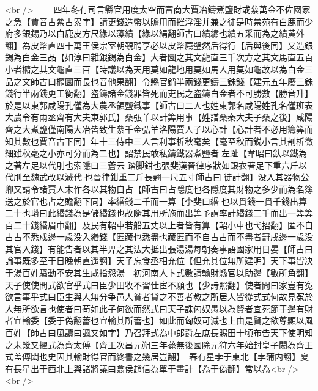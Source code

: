 <br />
　　四年冬有司言縣官用度太空而富商大賈冶鑄煮鹽財或絫萬金不佐國家之急【賈音古絫古累字】請更錢造幣以贍用而摧浮淫并兼之徒是時禁苑有白鹿而少府多銀錫乃以白鹿皮方尺緣以藻繢【緣以絹翻師古曰繢繡也繢五采而為之繢黄外翻】為皮幣直四十萬王侯宗室朝覲聘享必以皮幣薦璧然后得行【后與後同】又造銀錫為白金三品【如淳曰雜銀錫為白金】大者圜之其文龍直三千次方之其文馬直五百小者橢之其文龜直三百【時議以為天用莫如龍地用莫如馬人用莫如龜故以為白金三品之文師古曰橢圜而長也音他果翻】令縣官銷半兩錢更鑄三銖錢【建元五年廢三銖錢行半兩錢更工衡翻】盗鑄諸金錢罪皆死而吏民之盗鑄白金者不可勝數【勝音升】於是以東郭咸陽孔僅為大農丞領鹽鐵事【師古曰二人也姓東郭名咸陽姓孔名僅班表大農令有兩丞齊有大夫東郭氏】桑弘羊以計筭用事【姓譜桑秦大夫子桑之後】咸陽齊之大煮鹽僅南陽大冶皆致生絫千金弘羊洛陽賈人子以心計【心計者不必用籌筭而知其數也賈音古下同】年十三侍中三人言利事析秋毫矣【毫至秋而鋭小言其剖析微細雖秋毫之小亦可分而為二也】詔禁民敢私鑄鐵器煮鹽者左趾【韋昭曰釱以鐵為之著左足以代刖也索隱曰三蒼云踏脚鉗也張斐漢晉律序狀如跟衣著足下重六斤以代刖至魏武改以滅代也晉律鉗重二斤長翹一尺五寸師古曰徒計翻】没入其器物公卿又請令諸賈人末作各以其物自占【師古曰占隱度也各隱度其財物之多少而為名簿送之於官也占之贍翻下同】率緡錢二千而一算【李斐曰緡也以貫錢一貫千錢出算二十也瓚曰此緡錢為是儲緡錢也故隨其用所施而出筭予謂率計緡錢二千而出一筭筭百二十錢緡眉巾翻】及民有軺車若船五丈以上者皆有算【軺小車也弋招翻】匿不自占占不悉戍邊一歲没入緡錢【匿藏也悉盡也藏匿而不自占占而不盡者罸戌邊一歲没其官入錢】有能告者以其半畀之其法大抵出張湯湯每朝奏事語國家用日晏【師古曰論事既多至于日晚朝直遥翻】天子忘食丞相充位【但充其位無所建明】天下事皆决于湯百姓騷動不安其生咸指怨湯　初河南人卜式數請輸財縣官以助邊【數所角翻】天子使使問式欲官乎式曰臣少田牧不習仕宦不願也【少詩照翻】使者問曰家豈有寃欲言事乎式曰臣生與人無分争邑人貧者貸之不善者教之所居人皆從式式何故見寃於人無所欲言也使者曰苟如此子何欲而然式曰天子誅匈奴愚以為賢者宜死節于邊有財者宜輸委【委于偽翻蓄也宜輸其所蓄也】如此而匈奴可滅也上由是賢之欲尊顯以風百姓【師古曰風讀曰諷又如字】乃召拜式為中郎爵左庶長賜田十頃布告天下使明知之未幾又擢式為齊太傅【齊王次昌元朔三年薨無後國除元狩六年始封皇子閎為齊王式盖傅閎也史因其輸財得官而終書之幾居豈翻】　春有星孛于東北【孛蒲内翻】夏有長星出于西北上與諸將議曰翕侯趙信為單于畫計【為于偽翻】常以為<br />
<br />
